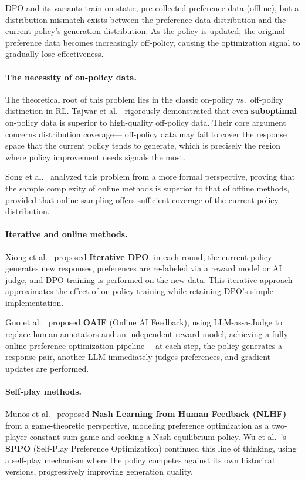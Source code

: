 \begin{problembox}
DPO and its variants train on static, pre-collected preference data (offline),
but a distribution mismatch exists between the preference data distribution and the current policy's generation distribution.
As the policy is updated, the original preference data becomes increasingly off-policy,
causing the optimization signal to gradually lose effectiveness.
\end{problembox}

\paragraph{The necessity of on-policy data.}
The theoretical root of this problem lies in the classic on-policy vs.\ off-policy distinction in RL.
Tajwar et al.\ \cite{tajwar2024onpolicy} rigorously demonstrated that
even \textbf{suboptimal} on-policy data is superior to high-quality off-policy data.
Their core argument concerns distribution coverage---
off-policy data may fail to cover the response space that the current policy tends to generate,
which is precisely the region where policy improvement needs signals the most.

Song et al.\ \cite{song2024coverage} analyzed this problem from a more formal perspective,
proving that the sample complexity of online methods is superior to that of offline methods,
provided that online sampling offers sufficient coverage of the current policy distribution.

\paragraph{Iterative and online methods.}
Xiong et al.\ \cite{xiong2023iterative} proposed \textbf{Iterative DPO}:
in each round, the current policy generates new responses,
preferences are re-labeled via a reward model or AI judge,
and DPO training is performed on the new data.
This iterative approach approximates the effect of on-policy training
while retaining DPO's simple implementation.

Guo et al.\ \cite{guo2024oaif} proposed \textbf{OAIF} (Online AI Feedback),
using LLM-as-a-Judge to replace human annotators and an independent reward model,
achieving a fully online preference optimization pipeline---
at each step, the policy generates a response pair,
another LLM immediately judges preferences, and gradient updates are performed.

\paragraph{Self-play methods.}
Munos et al.\ \cite{munos2024nlhf} proposed
\textbf{Nash Learning from Human Feedback (NLHF)} from a game-theoretic perspective,
modeling preference optimization as a two-player constant-sum game
and seeking a Nash equilibrium policy.
Wu et al.\ \cite{wu2024sppo}'s \textbf{SPPO} (Self-Play Preference Optimization)
continued this line of thinking, using a self-play mechanism where the policy competes against its own historical versions,
progressively improving generation quality.

